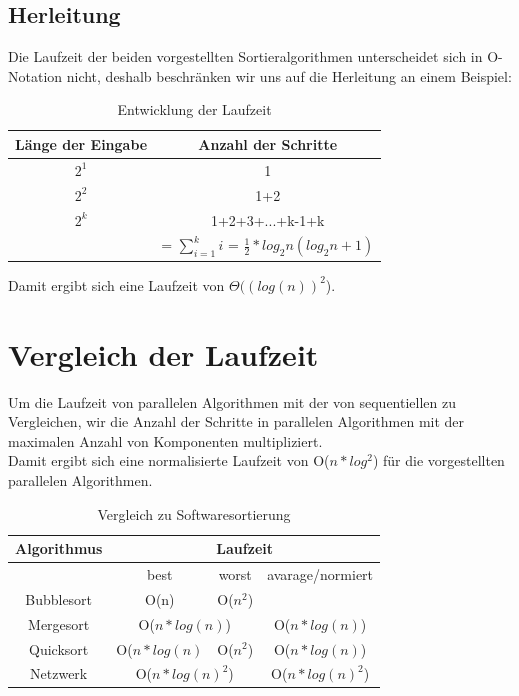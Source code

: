 \documentclass[11pt,ngerman]{article}
\begin{document}
\subsection{Herleitung}
Die Laufzeit der beiden vorgestellten Sortieralgorithmen unterscheidet sich in O-Notation nicht, deshalb beschränken wir uns auf die Herleitung an einem Beispiel:\\
\begin{table}[!h]
\begin{center}
	\begin{tabular}{c | c}
		Länge der Eingabe & Anzahl der Schritte \\ \hline
		$2^1$ & 1 \\
		$2^2$ & 1+2 \\
		$2^k$ & 1+2+3+...+k-1+k \\
		& = $\sum_{i=1}^ki$ = $\frac{1}{2} * log_2n (log_2n +1) $
	\end{tabular}
\end{center}
\caption{Entwicklung der Laufzeit}
\end{table}
\FloatBarrier
Damit ergibt sich eine Laufzeit von $\Theta((log(n))^2$). 
\section{Vergleich der Laufzeit}
Um die Laufzeit von parallelen Algorithmen mit der von sequentiellen zu Vergleichen, wir die Anzahl der Schritte in parallelen Algorithmen mit der maximalen Anzahl von Komponenten multipliziert.\\
Damit ergibt sich eine normalisierte Laufzeit von O($n*log^2$) für die vorgestellten parallelen Algorithmen.
\begin{table}[]
\begin{center}
	\begin{tabular}{c|c|c|c}
		Algorithmus & \multicolumn{3}{|c}{Laufzeit} \\ \hline
		& best & worst & avarage/normiert \\ \cline{2-4}
		Bubblesort & O(n) & O($n^2$) & \\
		Mergesort & \multicolumn{2}{|c|}{O($n * log(n)$)} & {O($n * log(n)$)} \\ 
		Quicksort & {O($n * log(n)$} & O($n^2$) & {O($n * log(n)$)} \\
		Netzwerk & \multicolumn{2}{|c|}{O($n * log(n)^2$)} & O($n * log(n)^2$) \\
	\end{tabular}
\end{center}
\caption{Vergleich zu Softwaresortierung}
\end{table}
\end{document}

